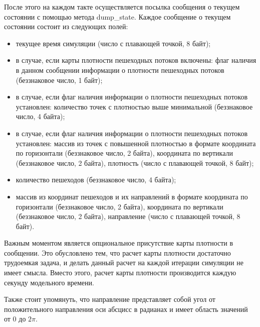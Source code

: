 После этого на каждом такте осуществляется посылка сообщения о текущем состоянии с помощью метода dump\_state.
Каждое сообщение о текущем состоянии состоит из следующих полей:
\begin{itemize}
  \item текущее время симуляции (число с плавающей точкой, 8 байт);
  \item в случае, если карты плотности пешеходных потоков включены: флаг наличия в данном сообщении информации о плотности пешеходных потоков (беззнаковое число, 1 байт);
  \item в случае, если флаг наличия информации о плотности пешеходных потоков установлен: количество точек с плотностью выше минимальной (беззнаковое число, 4 байта);
  \item в случае, если флаг наличия информации о плотности пешеходных потоков установлен: массив из точек с повышенной плотностью в формате
    координата по горизонтали (беззнаковое число, 2 байта), координата по вертикали (беззнаковое число, 2 байта), плотность (число с плавающей точкой, 8 байт);
  \item количество пешеходов (беззнаковое число, 4 байта);
  \item массив из координат пешеходов и их направлений в формате
    координата по горизонтали (беззнаковое число, 2 байта), координата по вертикали (беззнаковое число, 2 байта), направление (число с плавающей точкой, 8 байт).
\end{itemize}

Важным моментом является опциональное присутствие карты плотности в сообщении.
Это обусловлено тем, что расчет карты плотности достаточно трудоемкая задача, и делать данный расчет на каждой итерации симуляции не имеет смысла.
Вместо этого, расчет карты плотности производится каждую секунду модельного времени.

Также стоит упомянуть, что направление представляет собой угол от положительного направления оси абсцисс в радианах и имеет область значений от $0$ до $2\pi$.
